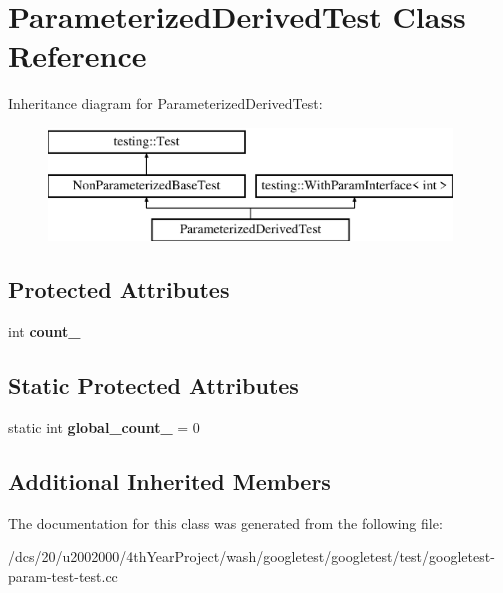 \hypertarget{classParameterizedDerivedTest}{}\section{Parameterized\+Derived\+Test Class Reference}
\label{classParameterizedDerivedTest}
Inheritance diagram for Parameterized\+Derived\+Test\+:\begin{figure}[H]
\begin{center}
\leavevmode
\includegraphics[height=3.000000cm]{classParameterizedDerivedTest}
\end{center}
\end{figure}
\subsection*{Protected Attributes}
\begin{DoxyCompactItemize}
\item 
\mbox{\label{classParameterizedDerivedTest_ad8a2968265e7477c13585d17bbd0492c}} 
int {\bfseries count\+\_\+}
\end{DoxyCompactItemize}
\subsection*{Static Protected Attributes}
\begin{DoxyCompactItemize}
\item 
\mbox{\label{classParameterizedDerivedTest_ab6c067a099764a9d58b5f2e8ebcb5d0f}} 
static int {\bfseries global\+\_\+count\+\_\+} = 0
\end{DoxyCompactItemize}
\subsection*{Additional Inherited Members}


The documentation for this class was generated from the following file\+:\begin{DoxyCompactItemize}
\item 
/dcs/20/u2002000/4th\+Year\+Project/wash/googletest/googletest/test/googletest-\/param-\/test-\/test.\+cc\end{DoxyCompactItemize}
